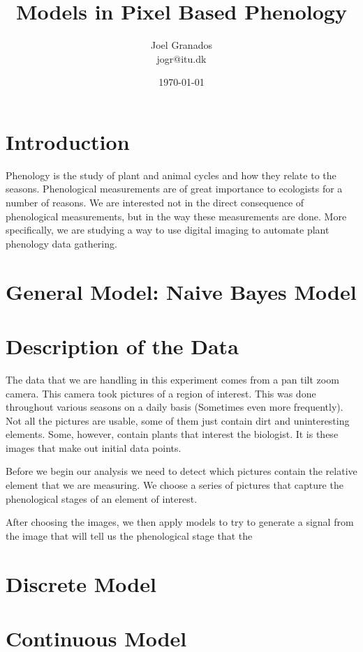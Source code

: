 \documentclass[a4paper,12pt]{report}
\begin{document}
\title{Models in Pixel Based Phenology}
\author{Joel Granados \\ jogr@itu.dk}
\date{ \today }

\maketitle

\section*{Introduction}
Phenology is the study of plant and animal cycles and how they relate to the
seasons. Phenological measurements are of great importance to ecologists for a
number of reasons. We are interested not in the direct consequence of
phenological measurements, but in the way these measurements are done. More
specifically, we are studying a way to use digital imaging to automate plant
phenology data gathering.

\section{General Model: Naive Bayes Model}

\section{Description of the Data}
The data that we are handling in this experiment comes from a pan tilt zoom
camera. This camera took pictures of a region of interest. This was done
throughout various seasons on a daily basis (Sometimes even more frequently).
Not all the pictures are usable, some of them just contain dirt and
uninteresting elements. Some, however, contain plants that interest the
biologist. It is these images that make out initial data points.

Before we begin our analysis we need to detect which pictures contain the
relative element that we are measuring. We choose a series of pictures that
capture the phenological stages of an element of interest. 


After choosing the images, we then apply
models to try to generate a signal from the image that will tell us the
phenological stage that the 

\section{Discrete Model}

\section{Continuous Model}
\end{document}
